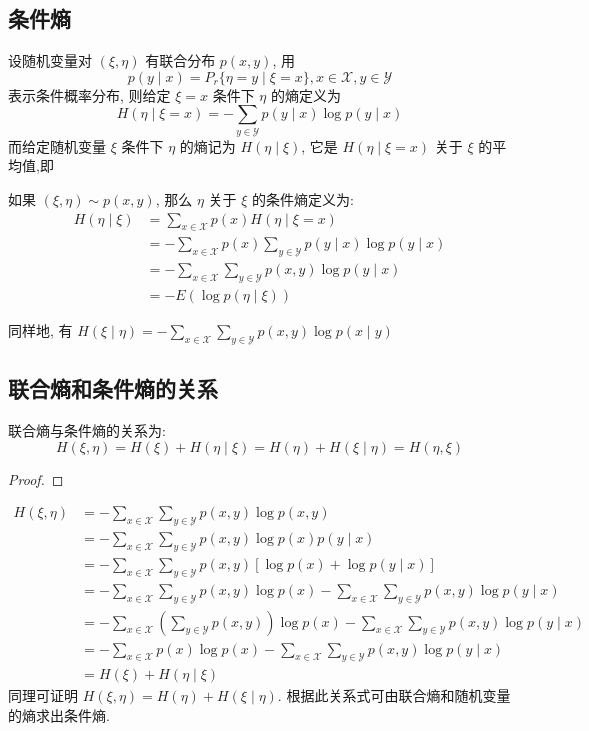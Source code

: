 \subsection{条件熵}
设随机变量对 $ (\xi, \eta) $ 有联合分布 $ p(x, y) $, 用
$$
p(y \mid x)=P_{r}\{\eta=y \mid \xi=x\}, x \in \mathscr{X}, y \in \mathscr{Y}
$$
表示条件概率分布, 则给定 $ \xi=x $ 条件下 $ \eta $ 的熵定义为
$$
H(\eta\mid \xi=x)=-\sum_{y \in \mathscr{Y}} p(y \mid x) \log p(y \mid x)
$$
而给定随机变量 $ \xi $ 条件下 $ \eta $ 的熵记为 $ H(\eta \mid \xi) $, 它是 $ H(\eta \mid \xi=x) $ 关于 $ \xi $ 的平均值,即


\begin{definition}
    如果 $ (\xi, \eta) \sim p(x, y) $, 那么 $ \eta $ 关于 $ \xi $ 的条件熵定义为:
$$
\begin{aligned}
H(\eta \mid \xi) & =\sum_{x \in \mathscr{X}} p(x) H(\eta \mid \xi=x) \\
& =-\sum_{x \in \mathscr{X}} p(x) \sum_{y \in \mathscr{Y}} p(y \mid x) \log p(y \mid x) \\
& =-\sum_{x \in \mathscr{X}} \sum_{y \in \mathscr{Y}} p(x, y) \log p(y \mid x)\\
&=-E(\log p(\eta \mid \xi))
\end{aligned}
$$

同样地, 有 $ H(\xi \mid \eta)=-\sum\limits_{x \in \mathscr{X}} \sum\limits_{y \in \mathscr{Y}} p(x, y) \log p(x \mid y) $
\end{definition}

\subsection{联合熵和条件熵的关系}
\begin{theorem}
     联合熵与条件熵的关系为:
$$
H(\xi, \eta)=H(\xi)+H(\eta \mid \xi)=H(\eta)+H(\xi \mid \eta)=H(\eta, \xi)
$$
\end{theorem}
\begin{proof}
    
\end{proof}
$$
\begin{aligned}
H(\xi, \eta)&=-\sum_{x \in \mathscr{X}} \sum_{y \in \mathscr{Y}} p(x, y) \log p(x, y)\\
&=-\sum_{x \in \mathscr{X}} \sum_{y \in \mathscr{Y}} p(x, y) \log p(x) p(y \mid x) \\
&=-\sum_{x \in \mathscr{X}} \sum_{y \in \mathscr{Y}} p(x, y)[\log p(x)+\log p(y \mid x)] \\
&=-\sum_{x \in \mathscr{X}} \sum_{y \in \mathscr{Y}} p(x, y) \log p(x)-\sum_{x \in \mathscr{X}} \sum_{y \in \mathscr{Y}} p(x, y) \log p(y \mid x) \\
&=-\sum_{x \in \mathscr{X}}\left(\sum_{y \in \mathscr{Y}} p(x, y)\right) \log p(x)-\sum_{x \in \mathscr{X}} \sum_{y \in \mathscr{Y}} p(x, y) \log p(y \mid x) \\
&=-\sum_{x \in \mathscr{X}} p(x) \log p(x)-\sum_{x \in \mathscr{X}} \sum_{y \in \mathscr{Y}} p(x, y) \log p(y \mid x) \\
&=H(\xi)+H(\eta \mid \xi)
\end{aligned}
$$
同理可证明 $ H(\xi, \eta)=H(\eta)+H(\xi \mid \eta) $.
根据此关系式可由联合熵和随机变量的熵求出条件熵.

